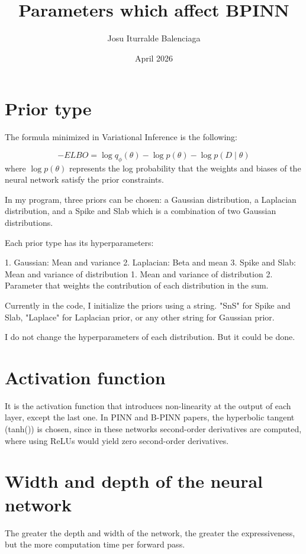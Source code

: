 \documentclass{article}
\title{Parameters which affect BPINN}
\author{Josu Iturralde Balenciaga}
\date{April 2026}
\begin{document}
\maketitle

\section{Prior type}

The formula minimized in Variational Inference is the following:

$$
-ELBO = \log{q_{\phi}(\theta)} - \log {p(\theta)} - \log{{p(D\mid\theta)}}
$$
where $\log{p(\theta)}$ represents the log probability that the weights and biases of the neural network satisfy the prior constraints.

In my program, three priors can be chosen: a Gaussian distribution, a Laplacian distribution, and a Spike and Slab which is a combination of two Gaussian distributions.

Each prior type has its hyperparameters:

1. Gaussian: Mean and variance
2. Laplacian: Beta and mean
3. Spike and Slab: Mean and variance of distribution 1. Mean and variance of distribution 2. Parameter that weights the contribution of each distribution in the sum.

Currently in the code, I initialize the priors using a string. "SnS" for Spike and Slab, "Laplace" for Laplacian prior, or any other string for Gaussian prior.

I do not change the hyperparameters of each distribution. But it could be done.

\section{Activation function}

It is the activation function that introduces non-linearity at the output of each layer, except the last one. In PINN and B-PINN papers, the hyperbolic tangent (tanh()) is chosen, since in these networks second-order derivatives are computed, where using ReLUs would yield zero second-order derivatives.

\section{Width and depth of the neural network}

The greater the depth and width of the network, the greater the expressiveness, but the more computation time per forward pass.
\end{document}
